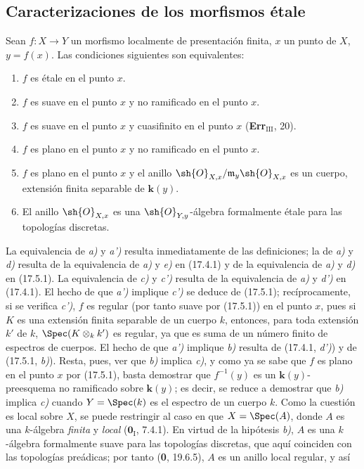 \subsection{Caracterizaciones de los morfismos étale}
\label{subsection:IV.17.6}

\begin{theorem}[17.6.1]
\label{IV.17.6.1}
Sean $f:X\to Y$ un morfismo localmente de presentación finita, $x$ un punto de $X$, $y=f(x)$. Las condiciones siguientes son equivalentes:
\begin{enumerate}
  \item[\textup{a)}] $f$ es étale en el punto $x$.
  \item[\textup{a$'$)}] $f$ es suave en el punto $x$ y no ramificado en el punto $x$.
  \item[\textup{b)}] $f$ es suave en el punto $x$ y cuasifinito en el punto $x$ \textup{(\textbf{Err}$_{\mathrm{III}}$, 20)}.
  \item[\textup{c)}] $f$ es plano en el punto $x$ y no ramificado en el punto $x$.
  \item[\textup{c$'$)}] $f$ es plano en el punto $x$ y el anillo $\sh{O}_{X,x}/\mathfrak m_y\sh{O}_{X,x}$ es un cuerpo, extensión finita separable de $\boldsymbol{k}(y)$.
  \item[\textup{d)}] El anillo $\sh{O}_{X,x}$ es una $\sh{O}_{Y,y}$-álgebra formalmente étale para las topologías discretas.
\end{enumerate}
\end{theorem}

La equivalencia de \emph{a)} y \emph{a')} resulta inmediatamente de las definiciones; la de \emph{a)} y \emph{d)} resulta de la equivalencia de \emph{a)} y \emph{e)} en (17.4.1) y de la equivalencia de \emph{a)} y \emph{d)} en (17.5.1). La equivalencia de \emph{c)} y \emph{c')} resulta de la equivalencia de \emph{a)} y \emph{d')} en (17.4.1). El hecho de que \emph{a')} implique \emph{c')} se deduce de (17.5.1); recíprocamente, si se verifica \emph{c')}, $f$ es regular (por tanto suave por (17.5.1)) en el punto $x$, pues si $K$ es una extensión finita separable de un cuerpo $k$, entonces, para toda extensión $k'$ de $k$, $\Spec(K\otimes_k k')$ es regular, ya que es suma de un número finito de espectros de cuerpos. El hecho de que \emph{a')} implique \emph{b)} resulta de (17.4.1, \emph{d')}) y de (17.5.1, \emph{b)}). Resta, pues, ver que \emph{b)} implica \emph{c)}, y como ya se sabe que $f$ es plano en el punto $x$ por (17.5.1), basta demostrar que $f^{-1}(y)$ es un $\boldsymbol{k}(y)$-preesquema no ramificado sobre $\boldsymbol{k}(y)$; es decir, se reduce a demostrar que \emph{b)} implica \emph{c)} cuando $Y=\Spec(k)$ es el espectro de un cuerpo $k$. Como la cuestión es local sobre $X$, se puede restringir al caso en que $X=\Spec(A)$, donde $A$ es una $k$-álgebra \emph{finita} y \emph{local} ($\mathbf{0}_{\mathrm I}$, 7.4.1). En virtud de la hipótesis \emph{b)}, $A$ es una $k$-álgebra formalmente suave para las topologías discretas, que aquí coinciden con las topologías preádicas; por tanto (\textbf 0, 19.6.5), $A$ es un anillo local regular, y así

